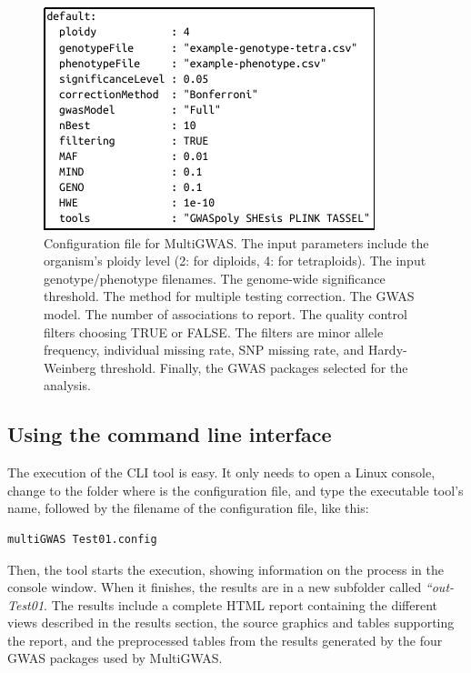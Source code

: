 \documentclass{article}
\begin{document}
\begin{figure}[H]
\begin{centering}
\includegraphics{images/paper-config-file}
\par\end{centering}
\caption{Configuration file for MultiGWAS. The input parameters include the organism's ploidy level (2: for diploids, 4: for tetraploids). The input genotype/phenotype filenames. The genome-wide significance threshold. The method for multiple testing correction. The GWAS model. The number of associations to report. The quality control filters choosing TRUE or FALSE. The filters are minor allele frequency, individual missing rate, SNP missing rate, and Hardy-Weinberg threshold. Finally, the GWAS packages selected for the analysis.
\label{fig:Configuration-file}}
\end{figure}

\subsection{Using the command line interface}
The execution of the CLI tool is easy. It only needs to open a Linux console, change to the folder where is the configuration file, and type the executable tool's name, followed by the filename of the configuration file, like this:

\begin{lstlisting}[language=bash,basicstyle={\small}]
multiGWAS Test01.config
\end{lstlisting}

Then, the tool starts the execution, showing information on the process in the console window. When it finishes, the results are in a new subfolder called \emph{``out-Test01}.  The results include a complete HTML report containing the different views described in the results section, the source graphics and tables supporting the report, and the preprocessed tables from the results generated by the four GWAS packages used by MultiGWAS.
\end{document}

